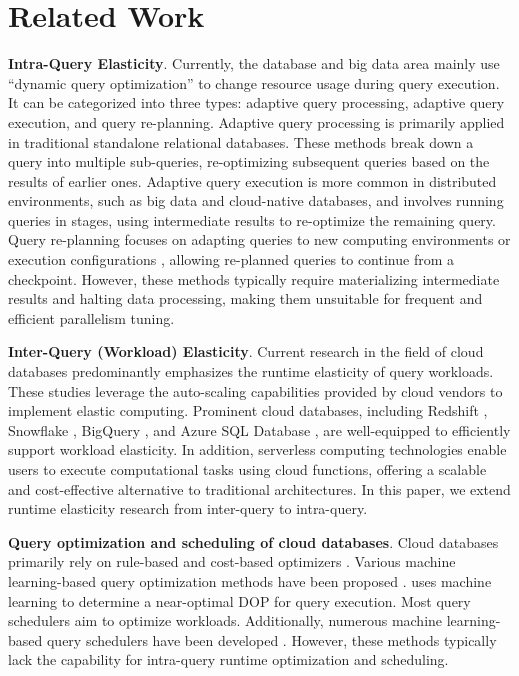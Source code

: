 \section{Related Work}
\textbf{Intra-Query Elasticity}. Currently, the database and big data area mainly use ``dynamic query optimization'' to change resource usage during query execution. It can be categorized into three types: adaptive query processing, adaptive query execution, and query re-planning. Adaptive query processing \cite{judicious-reOp-adaptive-proecessing, re-opt2} is primarily applied in traditional standalone relational databases. These methods break down a query into multiple sub-queries, re-optimizing subsequent queries based on the results of earlier ones. Adaptive query execution \cite{runtime-dynamic-op, presto-cbo-hbo-adaptive, sparkAdaptiveExecutionWeb, redshift-scaling-adaptive} is more common in distributed environments, such as big data and cloud-native databases, and involves running queries in stages, using intermediate results to re-optimize the remaining query. Query re-planning focuses on adapting queries to new computing environments \cite{QoS-deadline-replan, QOOP} or execution configurations \cite{byteDance-stream-replan}, allowing re-planned queries to continue from a checkpoint. However, these methods typically require materializing intermediate results and halting data processing, making them unsuitable for frequent and efficient parallelism tuning.


\noindent\textbf{Inter-Query (Workload) Elasticity}. Current research in the field of cloud databases predominantly emphasizes the runtime elasticity of query workloads. These studies leverage the auto-scaling capabilities provided by cloud vendors to implement elastic computing. Prominent cloud databases, including Redshift \cite{redshift-scaling-adaptive,redshift2024}, Snowflake \cite{snowflakeWeb}, BigQuery \cite{bigQueryWeb}, and Azure SQL Database \cite{AzureWeb}, are well-equipped to efficiently support workload elasticity. In addition, serverless computing technologies \cite{cloudfunction1,cloudfunction2,cloudfunction3} enable users to execute computational tasks using cloud functions, offering a scalable and cost-effective alternative to traditional architectures. In this paper, we extend runtime elasticity research from inter-query to intra-query.


\noindent\textbf{Query optimization and scheduling of cloud databases}. Cloud databases primarily rely on rule-based and cost-based optimizers \cite{presto-cbo-hbo-adaptive, polardb-cbo, microsoft-rbo-workload, steering-ML-rbo-workload, basic-rbo, presto-rbo, scope-rbo, spark-rbo, bytegraph-cbo-rbo}. Various machine learning-based query optimization methods have been proposed \cite{ML-autowlm, ML-planOptimize-cuttlefish, ML-optimize, autosteer-bao-workload, bao2}. \cite{DOPML} uses machine learning to determine a near-optimal DOP for query execution. Most query schedulers \cite{ML-workload-umbra,schedule-quickstep} aim to optimize workloads. Additionally, numerous machine learning-based query schedulers have been developed \cite{workload-ML-bufferpool, ML-planOptimize-workload-skinnerdb, ML-workload-schedule-lsched, ML-workload-schedule-decima, ML-autowlm}.  However, these methods typically lack the capability for intra-query runtime optimization and scheduling.